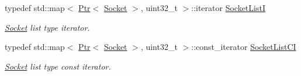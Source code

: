 \begin{DoxyCompactItemize}
typedef std\+::map$<$ \hyperlink{classns3_1_1Ptr}{Ptr}$<$ \hyperlink{classns3_1_1Socket}{Socket} $>$, uint32\+\_\+t $>$\+::iterator \hyperlink{classns3_1_1RipNg_a549052bbb55168d029f82d78384144b4}{Socket\+ListI}
\begin{DoxyCompactList}\small\item\em \hyperlink{classns3_1_1Socket}{Socket} list type iterator. \end{DoxyCompactList}\item 
typedef std\+::map$<$ \hyperlink{classns3_1_1Ptr}{Ptr}$<$ \hyperlink{classns3_1_1Socket}{Socket} $>$, uint32\+\_\+t $>$\+::const\+\_\+iterator \hyperlink{classns3_1_1RipNg_a7b361620ae7f6a01aadf958b9822f3fb}{Socket\+List\+CI}
\begin{DoxyCompactList}\small\item\em \hyperlink{classns3_1_1Socket}{Socket} list type const iterator. \end{DoxyCompactList}\end{DoxyCompactItemize}
